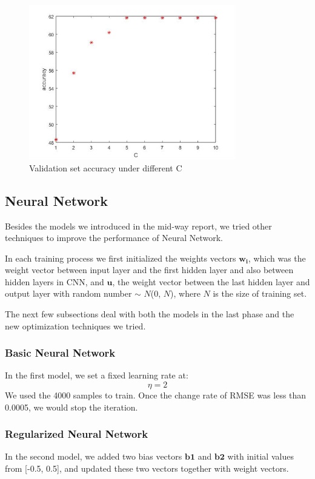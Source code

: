 \documentclass{article} %
\begin{document}
\begin{figure}[ht!]
	\centering
	\includegraphics[width=90mm]{C.jpg}
	\caption{Validation set accuracy under different C\label{figure2}}
\end{figure}

\subsection{Neural Network}
Besides the models we introduced in the mid-way report, we tried other techniques to improve the performance of Neural Network. 

In each training process we first initialized the weights vectors $\mathbf{w_i}$, which was the weight vector between input layer and the first hidden layer and also between hidden layers in CNN, and $\mathbf{u}$, the weight vector between the last hidden layer and output layer with random number $\sim$ $N$(0, $N$), where $N$ is the size of training set. 

The next few subsections deal with both the models in the last phase and the new optimization techniques we tried.

\subsubsection{Basic Neural Network}
In the first model, we set a fixed learning rate at:
\begin{equation}
\eta = 2
\end{equation}
We used the 4000 samples to train. Once the change rate of RMSE was less than 0.0005, we would stop the iteration. 

\subsubsection{Regularized Neural Network}
In the second model, we added two bias vectors $\mathbf{b1}$ and  $\mathbf{b2}$ with initial values from [-0.5, 0.5], and updated these two vectors together with weight vectors. 
\end{document}
